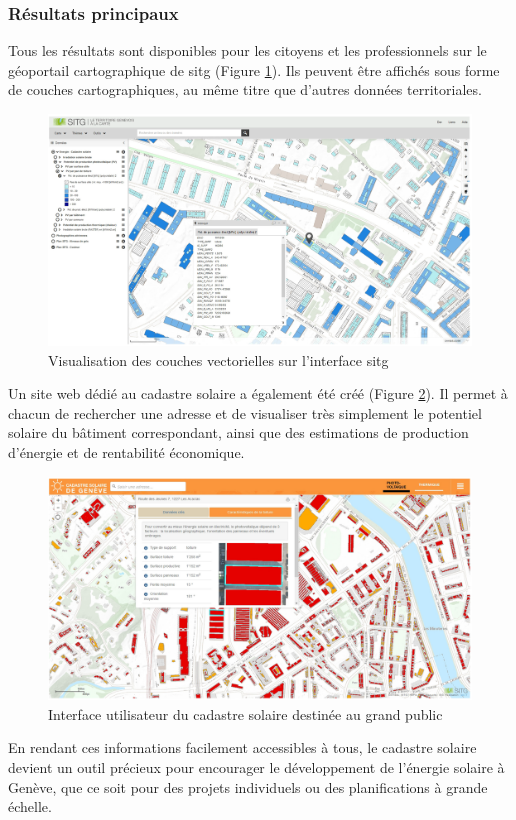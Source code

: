 {\subsubsection{Résultats principaux}
\par{Tous les résultats sont disponibles pour les citoyens et les professionnels sur le géoportail cartographique de \acrshort{sitg} (Figure \ref{fig:cadastre_solaire_couche_vec_sitg}). Ils peuvent être affichés sous forme de couches cartographiques, au même titre que
d'autres données territoriales.}
\begin{figure}[H]
    \centering
    \includegraphics[width=1\linewidth]{02-main//figures/cadastre_solaire_couche_vec_sitg.png}
    \caption{Visualisation des couches vectorielles sur l'interface \acrshort{sitg} \cite{desthieux_solar_2018}}
    \label{fig:cadastre_solaire_couche_vec_sitg}
\end{figure}
\par{Un site web dédié au cadastre solaire a également été créé (Figure \ref{fig:cadastre_solaire_sitg_labs}). Il permet à chacun de rechercher une adresse et de visualiser très simplement le potentiel solaire du bâtiment correspondant, ainsi que des estimations de production d'énergie et de rentabilité économique.}
\begin{figure}[H]
    \centering
    \includegraphics[width=1\linewidth]{02-main//figures/cadastre_solaire_sitg_labs.png}
    \caption{Interface utilisateur du cadastre solaire destinée au grand public \cite{desthieux_solar_2018}}
    \label{fig:cadastre_solaire_sitg_labs}
\end{figure}
\par{En rendant ces informations facilement accessibles à tous, le cadastre solaire devient un outil précieux pour encourager le développement de l'énergie solaire à Genève, que ce soit pour des projets individuels ou des planifications à grande échelle.}

}

